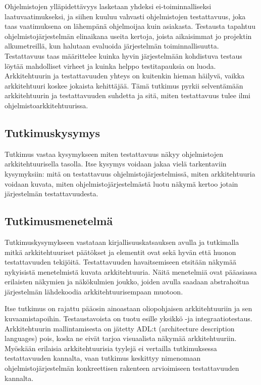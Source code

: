 \documentclass[finnish]{tktltiki2}
\theoremstyle{definition}
\theoremstyle{remark}
\begin{document}
Ohjelmistojen ylläpidettävyys lasketaan yhdeksi ei-toiminnalliseksi laatuvaatimukseksi, ja siihen kuuluu vahvasti ohjelmistojen testattavuus, joka taas vaatimuksena on lähempänä ohjelmoijaa kuin asiakasta. Testausta tapahtuu ohjelmistojärjestelmän elinaikana useita kertoja, joista  aikaisimmat jo projektin alkumetreillä, kun halutaan evaluoida järjestelmän toiminnallisuutta. Testattavuus taas määrittelee kuinka hyvin järjestelmään kohdistuva testaus löytää mahdolliset virheet ja kuinka helppo testitapauksia on luoda. Arkkitehtuurin ja testattavuuden yhteys on kuitenkin hieman häilyvä, vaikka arkkitehtuuri koskee jokaista kehittäjää. Tämä tutkimus pyrkii selventämään arkkitehtuurin ja testattavuuden suhdetta ja sitä, miten testattavuus tulee ilmi ohjelmistoarkkitehtuurissa. 

\subsection{Tutkimuskysymys}
Tutkimus vastaa kysymykseen miten testattavuus näkyy ohjelmistojen arkkitehtuurisella tasolla. Itse kysymys voidaan jakaa vielä tarkentaviin kysymyksiin: mitä on testattavuus ohjelmistojärjestelmissä, miten arkkitehtuuria voidaan kuvata, miten ohjelmistojärjestelmästä luotu näkymä kertoo jotain järjestelmän testattavuudesta. 

\subsection{Tutkimusmenetelmä}
Tutkimuskysymykseen vastataan kirjallisuuskatsauksen avulla ja tutkimalla mitkä arkkitehtuuriset päätökset ja elementit ovat sekä hyvän että huonon testattavuuden tekijöitä. Testattavuuden havaitsemiseen etsitään näkymää nykyisistä menetelmistä kuvata arkkitehtuuria. Näitä menetelmiä ovat pääasiassa erilaisten näkymien ja näkökulmien joukko, joiden avulla saadaan abstrahoitua järjestelmän lähdekoodia arkkitehtuurisempaan muotoon.

Itse tutkimus on rajattu pääosin ainoastaan oliopohjaisen arkkitehtuuriin ja sen kuvaamistapoihin. Testaustavoista on tuotu esille yksikkö -ja integraatiotestaus. Arkkitehtuurin mallintamisesta on jätetty ADL:t (architecture description languages) pois, koska ne eivät tarjoa visuaalista näkymää arkkitehtuuriin. Myöskään erilaisia arkkitehtuurisia tyylejä ei vertailla tutkimuksessa testattavuuden kannalta, vaan tutkimus keskittyy nimenomaan ohjelmistojärjestelmän konkreettisen rakenteen arvioimiseen testattavuuden kannalta.
\end{document}
